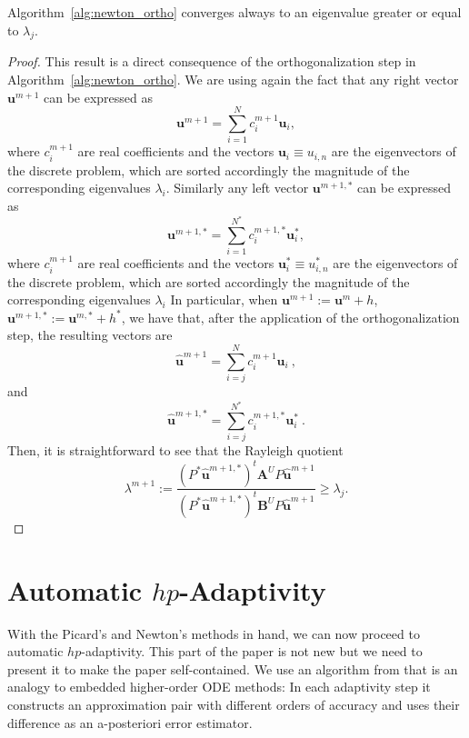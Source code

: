 \documentclass[smallextended]{svjour3}
\begin{document}
\begin{theorem}
Algorithm~\ref{alg:newton_ortho} converges always to an eigenvalue greater or equal to $\lambda_j$.
\end{theorem}

\begin{proof}
This result is a direct consequence of the orthogonalization step in Algorithm~\ref{alg:newton_ortho}.
We are using again the fact that any right vector $\mathbf{u}^{m+1}$ can be expressed as 
$$
\mathbf{u}^{m+1}=\sum_{i=1}^N c_i^{m+1} \mathbf{u}_i,
$$
where $c_i^{m+1}$ are real coefficients  and the vectors $\mathbf{u}_i\equiv u_{i,n}$ are the eigenvectors of the discrete problem, which are sorted accordingly the magnitude of the corresponding eigenvalues $\lambda_i$.
Similarly any left vector $\mathbf{u}^{m+1,*}$ can be expressed as 
$$
\mathbf{u}^{m+1,*}=\sum_{i=1}^{N^*} c_i^{m+1,*} \mathbf{u}_i^*,
$$
where $c_i^{m+1}$ are real coefficients and the vectors $\mathbf{u}_i^*\equiv u_{i,n}^*$ are the eigenvectors of the discrete problem, which are sorted accordingly the magnitude of the corresponding eigenvalues $\lambda_i$
In particular, when $\mathbf{u}^{m+1}:=\mathbf{u}^m+h$, $\mathbf{u}^{m+1,*}:=\mathbf{u}^{m,*}+h^*$, we have that, after the application of the orthogonalization step, the resulting vectors are
$$
\mathbf{\hat u}^{m+1}=\sum_{i=j}^N c_i^{m+1} \mathbf{u}_i\ ,
$$
and 
$$
\mathbf{\hat u}^{m+1,*}=\sum_{i=j}^{N^*} c_i^{m+1,*} \mathbf{u}_i^* \ .
$$
Then, it is straightforward to see that the Rayleigh quotient
$$
\displaystyle\lambda^{m+1}:=\frac{(P^*\mathbf{\hat u}^{m+1,*})^t\mathbf{A}^U P\mathbf{\hat u}^{m+1}}{(P^*\mathbf{\hat u}^{m+1,*})^t\mathbf{B}^U P\mathbf{\hat u}^{m+1}} \ge \lambda_j.
$$
\end{proof}



\section{Automatic $hp$-Adaptivity}\label{sec:adapt}


With the Picard's and Newton's methods in hand, we can now proceed to automatic $hp$-adaptivity.
This part of the paper is not new but we need to present it to make the paper self-contained.
We use an algorithm from \cite{solin3} that is an analogy to embedded higher-order ODE methods: 
In each adaptivity step it 
constructs an approximation pair with different orders of accuracy and uses their difference 
as an a-posteriori error estimator. 
\end{document}
